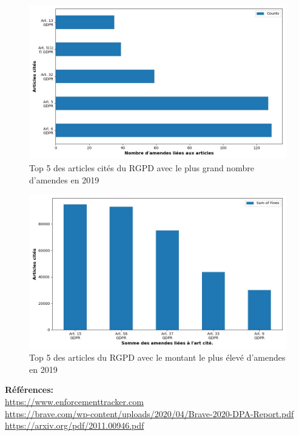 \documentclass[french]{article}
\begin{document}
	\begin{multicols}{2}
	\begin{figure}
		[H]\centering\includegraphics[width=1.0\linewidth]{graphs/top10_quoted_year}
		\caption{Top 5 des articles cités du RGPD avec le plus grand nombre d'amendes en 2019}
	\end{figure}
	\begin{figure}
		[H]\centering\includegraphics[width=1\linewidth]{graphs/top10_quoted_year_fines}
		\caption{Top 5 des articles  du RGPD avec le montant le plus élevé d'amendes en 2019}
	 \end{figure}
	
	\end{multicols}









\vspace*{\fill}
\textbf{Références:}\\
\href{https://www.enforcementtracker.com}{https://www.enforcementtracker.com}\\
\href{https://brave.com/wp-content/uploads/2020/04/Brave-2020-DPA-Report.pdf}{https://brave.com/wp-content/uploads/2020/04/Brave-2020-DPA-Report.pdf}\\
\href{https://arxiv.org/pdf/2011.00946.pdf}{https://arxiv.org/pdf/2011.00946.pdf}
\end{document}
